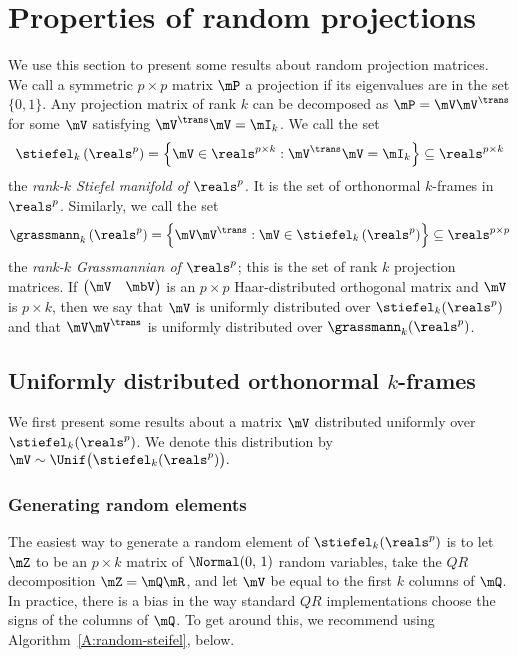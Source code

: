 
\chapter{Properties of random projections}

We use this section to present some results about random projection
matrices.  We call a symmetric $p \times p$ matrix $\mP$ a projection 
if its eigenvalues are in the set $\{ 0, 1 \}$.  Any projection matrix of rank
$k$ can be decomposed as $\mP = \mV \mV^\trans$ for some $\mV$
satisfying $\mV^\trans \mV = \mI_k$.  We call the set 
\[
    \stiefel_{k}\left( \reals^p \right)
        =
        \left\{
            \mV \in \reals^{p \times k}
            :
            \mV^\trans \mV = \mI_k
        \right\}
        \subseteq
        \reals^{p \times k}
\]
the \emph{rank-$k$ Stiefel manifold of $\reals^p$}.  It is the set
of orthonormal $k$-frames in $\reals^p$.  Similarly, we call 
the set
\[
    \grassmann_k\left( \reals^p \right)
        =
        \left\{
            \mV \mV^\trans
            :
            \mV \in \stiefel_k \left( \reals^p \right)
        \right\}
        \subseteq
        \reals^{p \times p}
\]
the \emph{rank-$k$ Grassmannian of $\reals^p$}; this is the set of
rank $k$ projection matrices.  If
\(
    \left(
    \begin{matrix}
        \mV & \mbV
    \end{matrix}
    \right)
\)
is an $p \times p$ Haar-distributed orthogonal matrix and $\mV$ is
$p \times k$, then we say that $\mV$ is uniformly distributed
over $\stiefel_k( \reals^p )$ and that $\mV \mV^\trans$ is uniformly
distributed over $\grassmann_k(\reals^p)$.


\section{Uniformly distributed orthonormal $k$-frames}

We first present some results about a matrix $\mV$ distributed uniformly
over $\stiefel_k(\reals^p)$.  We denote this distribution by
\(
    \mV 
        \sim
            \Unif \big(
                \stiefel_k(\reals^p)
            \big).
\)

\subsection{Generating random elements}

The easiest way to generate a random element of $\stiefel_k(\reals^p)$ is
to let $\mZ$ to be an $p \times k$ matrix of \iid $\Normal( 0, \, 1)$
random variables, take the $QR$ decomposition $\mZ = \mQ \mR$, and let
$\mV$ be equal to the first $k$ columns of $\mQ$.  In practice, there is
a bias in the way standard $QR$ implementations choose the signs of the
columns of $\mQ$.  To get around this, we recommend using 
Algorithm~\ref{A:random-steifel}, below.

